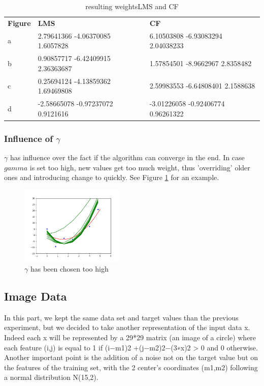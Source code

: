 \begin{table}[]
\begin{tabular}{lll}
\textbf{Figure} & \textbf{LMS} & \textbf{CF} \\
a               &        2.79641366 -4.06370085  1.6057828       &     6.10503808 -6.93083294  2.04038233       \\
b               &      0.90857717 -6.42409915  2.36363687        &     1.57854501 -8.9662967   2.8358482          \\
c               &        0.25694124 -4.13859362  1.69469808      &        2.59983553 -6.64808401  2.1588638         \\
d               &        -2.58665078 -0.97237072  0.9121616       &         -3.01226058 -0.92406774  0.96261322        \\
\end{tabular}
\caption{\label{tab:weights}resulting weights{LMS} and {CF}}
\end{table}


\subsubsection{Influence of $\gamma$ }
 $\gamma$ has influence over the fact if the algorithm can converge in the end. In case $gamma$ is set too high, new values get too much weight, thus 'overriding' older ones and introducing change to quickly. See Figure \ref {fig:gamma} for an example.

\begin{figure}[h]
\begin{center}
\centering
\includegraphics[width=5cm]{figures/fig_gamma.png}
\end{center}
\caption{\label{fig:gamma} $\gamma$ has been chosen too high }
\end{figure}


\newpage
\subsection{Image Data}
In this part, we kept the same data set and target values than the previous experiment, but we decided to take another representation of the input data x. Indeed each x will be represented by a 29*29 matrix (an image of a circle) where each feature (i,j) is equal to 1 if (i−m1)2 +(j−m2)2−(3∗x)2 > 0 and 0 otherwise. Another important point is the addition of a noise not on the target value but on the features of the training set, with the 2 center's coordinates (m1,m2) following a normal distribution N(15,2).

